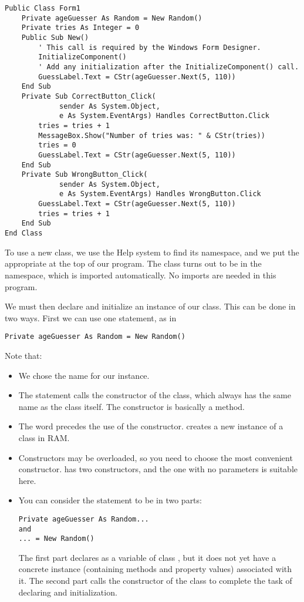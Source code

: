 		\begin{lstlisting}
Public Class Form1
	Private ageGuesser As Random = New Random()
	Private tries As Integer = 0
	Public Sub New()
		' This call is required by the Windows Form Designer.
		InitializeComponent()
		' Add any initialization after the InitializeComponent() call.
		GuessLabel.Text = CStr(ageGuesser.Next(5, 110))
	End Sub
	Private Sub CorrectButton_Click(
			 sender As System.Object,
			 e As System.EventArgs) Handles CorrectButton.Click
		tries = tries + 1
		MessageBox.Show("Number of tries was: " & CStr(tries))
		tries = 0
		GuessLabel.Text = CStr(ageGuesser.Next(5, 110))
	End Sub
	Private Sub WrongButton_Click(
			 sender As System.Object,
			 e As System.EventArgs)	Handles WrongButton.Click
		GuessLabel.Text = CStr(ageGuesser.Next(5, 110))
		tries = tries + 1
	End Sub
End Class
		\end{lstlisting}
		To use a new class, we use the Help system to find its namespace, and we put the appropriate  at the top of our program. The  class turns out to be in the  namespace, which is imported automatically. No imports are needed in this program.
		
		We must then declare and initialize an instance of our class. This can be done in two ways. First we can use one statement, as in
		\begin{lstlisting}
Private ageGuesser As Random = New Random()
		\end{lstlisting}
		Note that:
		\begin{itemize}
			\item We chose the name  for our instance.
			\item The statement calls the constructor of the  class, which always has the same name as the class itself. The constructor is basically a method.
			\item The word  precedes the use of the constructor.  creates a new instance of a class in RAM.
			\item Constructors may be overloaded, so you need to choose the most convenient constructor.  has two constructors, and the one with no parameters is suitable here.
			\item You can consider the statement to be in two parts:
				\begin{lstlisting}
Private ageGuesser As Random...
and
... = New Random()
				\end{lstlisting}
				The first part declares  as a variable of class , but it does not yet have a concrete instance (containing methods and property values) associated with it. The second part calls the constructor of the  class to complete the task of declaring and initialization.
		\end{itemize}

